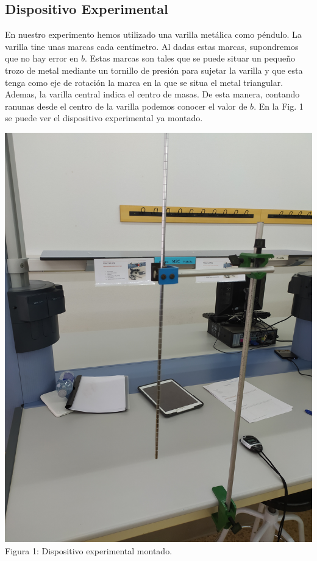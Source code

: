 \documentclass{article}
\begin{document}
\begin{multicols}{2}
\section{Dispositivo Experimental}
En nuestro experimento hemos utilizado una varilla metálica como péndulo. La varilla tine unas marcas cada centímetro. Al dadas estas marcas, supondremos que no hay error en $b$. Estas marcas son tales que se puede situar un pequeño trozo de metal mediante un tornillo de presión para sujetar la varilla y que esta tenga como eje de rotación la marca en la que se situa el metal triangular. Ademas, la varilla central indica el centro de masas. De esta manera, contando ranunas desde el centro de la varilla podemos conocer el valor de $b$. En la Fig. 1 se puede ver el dispositivo experimental ya montado.
\begin{center}
    \includegraphics[scale=0.06, angle=-90]{figures/c2.png}\\
    Figura 1: Dispositivo experimental montado.
\end{center}


\end{multicols}
\end{document}
